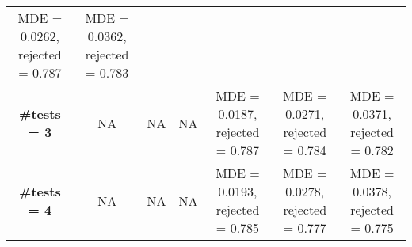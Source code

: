 \documentclass[
]{article}
\begin{document}
\begin{longtable}[]{@{}ccccccc@{}}
\begin{minipage}[t]{0.16\columnwidth}
MDE = 0.0262, rejected = 0.787\strut
\end{minipage} & \begin{minipage}[t]{0.16\columnwidth}\centering
MDE = 0.0362, rejected = 0.783\strut
\end{minipage}\tabularnewline
\begin{minipage}[t]{0.08\columnwidth}\centering
\textbf{\#tests = 3}\strut
\end{minipage} & \begin{minipage}[t]{0.08\columnwidth}\centering
NA\strut
\end{minipage} & \begin{minipage}[t]{0.08\columnwidth}\centering
NA\strut
\end{minipage} & \begin{minipage}[t]{0.08\columnwidth}\centering
NA\strut
\end{minipage} & \begin{minipage}[t]{0.16\columnwidth}\centering
MDE = 0.0187, rejected = 0.787\strut
\end{minipage} & \begin{minipage}[t]{0.16\columnwidth}\centering
MDE = 0.0271, rejected = 0.784\strut
\end{minipage} & \begin{minipage}[t]{0.16\columnwidth}\centering
MDE = 0.0371, rejected = 0.782\strut
\end{minipage}\tabularnewline
\begin{minipage}[t]{0.08\columnwidth}\centering
\textbf{\#tests = 4}\strut
\end{minipage} & \begin{minipage}[t]{0.08\columnwidth}\centering
NA\strut
\end{minipage} & \begin{minipage}[t]{0.08\columnwidth}\centering
NA\strut
\end{minipage} & \begin{minipage}[t]{0.08\columnwidth}\centering
NA\strut
\end{minipage} & \begin{minipage}[t]{0.16\columnwidth}\centering
MDE = 0.0193, rejected = 0.785\strut
\end{minipage} & \begin{minipage}[t]{0.16\columnwidth}\centering
MDE = 0.0278, rejected = 0.777\strut
\end{minipage} & \begin{minipage}[t]{0.16\columnwidth}\centering
MDE = 0.0378, rejected = 0.775\strut

\end{minipage}
\end{longtable}
\end{document}
